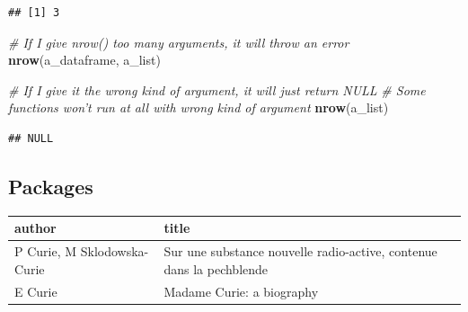 \documentclass[
]{book}
\newenvironment{Shaded}{\begin{snugshade}}{\end{snugshade}}
\newcommand{\CommentTok}[1]{\textcolor[rgb]{0.56,0.35,0.01}{\textit{#1}}}
\newcommand{\DataTypeTok}[1]{\textcolor[rgb]{0.13,0.29,0.53}{#1}}
\newcommand{\DecValTok}[1]{\textcolor[rgb]{0.00,0.00,0.81}{#1}}
\newcommand{\KeywordTok}[1]{\textcolor[rgb]{0.13,0.29,0.53}{\textbf{#1}}}
\newcommand{\NormalTok}[1]{#1}
\newcommand{\OperatorTok}[1]{\textcolor[rgb]{0.81,0.36,0.00}{\textbf{#1}}}
\newcommand{\OtherTok}[1]{\textcolor[rgb]{0.56,0.35,0.01}{#1}}
\newcommand{\StringTok}[1]{\textcolor[rgb]{0.31,0.60,0.02}{#1}}
\begin{document}
\begin{verbatim}
## [1] 3
\end{verbatim}

\begin{Shaded}
\begin{Highlighting}[]
\CommentTok{# If I give nrow() too many arguments, it will throw an error}
\KeywordTok{nrow}\NormalTok{(a_dataframe, a_list)}
\end{Highlighting}
\end{Shaded}

\begin{Shaded}
\begin{Highlighting}[]
\CommentTok{# If I give it the wrong kind of argument, it will just return NULL}
\CommentTok{# Some functions won't run at all with wrong kind of argument}
\KeywordTok{nrow}\NormalTok{(a_list)}
\end{Highlighting}
\end{Shaded}

\begin{verbatim}
## NULL
\end{verbatim}

\hypertarget{scholarex}{%
\subsection{Packages}\label{scholarex}}

\begin{Shaded}
\end{Shaded}

\begin{tabular}{l|l}
\hline
author & title\\
\hline
P Curie, M Sklodowska-Curie & Sur une substance nouvelle radio-active, contenue dans la pechblende\\
\hline
E Curie & Madame Curie: a biography\\
\hline
\end{tabular}
\end{document}
